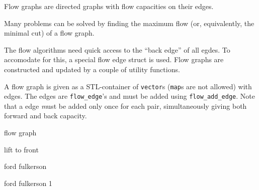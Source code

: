 
Flow graphs are directed graphs with flow capacities on their edges.

Many problems can be solved by finding the maximum flow (or, equivalently,
the minimal cut) of a flow graph.

The flow algorithms need quick access to the ``back edge'' of all egdes.
To accomodate for this, a special flow edge struct is used.
Flow graphs are constructed and updated by a couple of utility functions.

A flow graph is given as a STL-container of {\tt vector}s ({\tt map}s are
not allowed) with edges. The edges are {\tt flow\_edge}'s and must be added
using {\tt flow\_add\_edge}. Note that a edge {\emph must be} added only once
for each pair, simultaneously giving both forward and back capacity.


\begin{algorithm}{flow graph}
\end{algorithm}

\begin{algorithm}{lift to front}
\end{algorithm}

\begin{algorithm}{ford fulkerson}

\end{algorithm}

\begin{algorithm}{ford fulkerson 1}

\end{algorithm}
